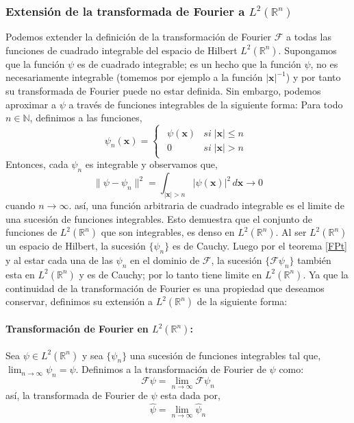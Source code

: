 \documentclass[12pt]{book}
\numberwithin{equation}{chapter}
\def\R{\mathbb{R}}
\def\rar{\rightarrow}
\def\F{\mathcal{F}}
\def\x{\mathbf{x}}
\begin{document}
\subsubsection{Extensi\'on de la transformada de Fourier a $L^{2}(\R^{n})$}
Podemos extender la definici\'on de la transformaci\'on de Fourier $\F$ a todas las funciones de cuadrado integrable del espacio de Hilbert $L^{2}(\R^{n})$. Supongamos que la funci\'on $\psi$ es de cuadrado integrable; es un hecho que la funci\'on $\psi$, no es necesariamente integrable (tomemos por ejemplo a la funci\'on $|\x|^{-1}$) y por tanto su transformada de Fourier puede no estar definida. Sin embargo, podemos aproximar a $\psi$ a trav\'es de funciones integrables de la siguiente forma: Para todo $n \in \mathbb{N}$, definimos a las funciones,
$$ \psi_{n}(\x)=\begin{cases} \begin{matrix} \psi(\x) & si\; |\x| \leq n \\ 0 & si\; |\x|>n \end{matrix} \end{cases} $$
Entonces, cada $\psi_{n}$ es integrable y observamos que,
$$ \| \psi - \psi_{n} \|^{2}= \int_{|\x|>n} |\psi(\x)|^{2}\, d\x \rar 0 $$
cuando $n \rar \infty$. as\'i, una funci\'on arbitraria de cuadrado integrable es el limite de una sucesi\'on de funciones integrables. Esto demuestra que el conjunto de funciones de $L^{2}(\R^{n})$ que son integrables, es denso en $L^{2}(\R^{n})$. Al ser $L^{2}(\R^{n})$ un espacio de Hilbert, la sucesi\'on $\{ \psi_{n} \}$ es de Cauchy. Luego por el teorema \ref{FPt} y al estar cada una de las $\psi_{n}$ en el dominio de $\F$, la sucesi\'on $ \{  \F \psi_{n} \} $ tambi\'en esta en $L^{2}(\R^{n})$ y es de Cauchy; por lo tanto tiene limite en $L^{2}(\R^{n})$. Ya que la continuidad de la transformaci\'on de Fourier es una propiedad que deseamos conservar, definimos su extensi\'on a $L^{2}(\R^{n})$ de la siguiente forma: 

\paragraph{Transformaci\'on de Fourier en $L^{2}(\R^{n})$:} Sea $\psi \in L^{2}(\R^{n}) $ y sea $\{ \psi_{n} \}$ una sucesi\'on de funciones integrables tal que, $ \lim_{n \rar \infty} \psi_{n} = \psi $. Definimos a la transformaci\'on de Fourier de $\psi$ como:
\begin{equation}
\F \psi = \lim_{n \rar \infty} \F \psi_{n}
\end{equation}
as\'i, la transformada de Fourier de $\psi$ esta dada por,
\begin{equation}
\hat{\psi} = \lim_{n \rar \infty} \hat{\psi}_{n}
\end{equation}
\rightline{$\dag$}
 
\end{document}
